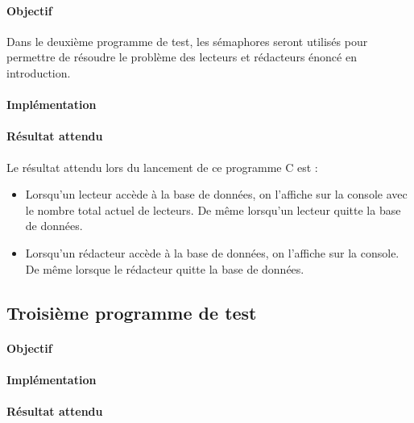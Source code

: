 \documentclass[12pt]{article}
\begin{document}
  \paragraph{Objectif\\}
  Dans le deuxième programme de test, les sémaphores seront utilisés pour permettre de résoudre le problème des lecteurs et rédacteurs énoncé en introduction.
  \paragraph{Implémentation\\}
  \paragraph{Résultat attendu\\}
  Le résultat attendu lors du lancement de ce programme C est :
  \begin{itemize}
    \item Lorsqu'un lecteur accède à la base de données, on l'affiche sur la console avec le nombre total actuel de lecteurs. De même lorsqu'un lecteur quitte la base de données.
    \item Lorsqu'un rédacteur accède à la base de données, on l'affiche sur la console. De même lorsque le rédacteur quitte la base de données.
  \end{itemize}
\newpage
\subsection{Troisième programme de test}
  \paragraph{Objectif\\}
  \paragraph{Implémentation\\}
  \paragraph{Résultat attendu\\}
\end{document}
